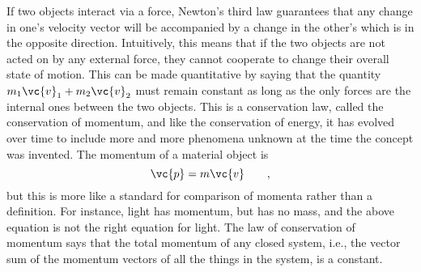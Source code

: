 \begin{summary}

\begin{vocab}




\end{vocab}

\begin{notation}



\end{notation}

\begin{othernotation}




\end{othernotation}

\begin{summarytext}

If two objects interact via a force, Newton's third law
guarantees that any change in one's velocity vector will be
accompanied by a change in the other's which is in the
opposite direction. Intuitively, this means that if the two
objects are not acted on by any external force, they cannot
cooperate to change their overall state of motion. This can
be made quantitative by saying that the quantity 
$m_1 \vc{v}_1+m_2 \vc{v}_2$
must remain constant as long as the only forces are the
internal ones between the two objects. This is a conservation
law, called the conservation of momentum, and like the
conservation of energy, it has evolved over time to include
more and more phenomena unknown at the time the concept was
invented. The momentum of a material object is
\begin{equation*}
                \vc{p}  =  m\vc{v}   \qquad   ,
\end{equation*}
but this is more like a standard for comparison of momenta
rather than a definition. For instance, light has momentum,
but has no mass, and the above equation is not the right
equation for light. The law of conservation of momentum
says that the total momentum of any closed system, i.e., the
vector sum of the momentum vectors of all the things in the
system, is a constant.


\end{summarytext}
\end{summary}
